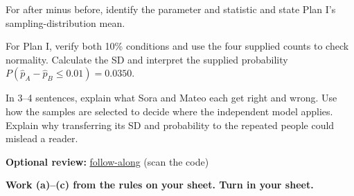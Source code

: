 \documentclass[14pt]{extarticle}
\begin{document}
\begin{description}[leftmargin=1.15in, labelwidth=1in, itemsep=2pt, topsep=2pt]
  \item[\dokbadge{1}~(a)] For after minus before, identify the parameter and statistic and state Plan I's sampling-distribution mean.
  \item[\dokbadge{2}~(b)] For Plan I, verify both 10\% conditions and use the four supplied counts to check normality. Calculate the SD and interpret the supplied probability $P(\widehat p_A-\widehat p_B\leq0.01)=0.0350$.
  \item[\dokbadge{3}~(c)] In 3--4 sentences, explain what Sora and Mateo each get right and wrong. Use how the samples are selected to decide where the independent model applies. Explain why transferring its SD and probability to the repeated people could mislead a reader.
\end{description}

\vfill
\noindent\begin{minipage}{0.84\linewidth}
\textbf{Optional review:} \href{https://robjohncolson.github.io/apstats-live-worksheet/u5_lesson6_live.html}{follow-along} (scan the code)\par
\textbf{Work (a)--(c) from the rules on your sheet. Turn in your sheet.}
\end{minipage}\hfill
{}
\end{document}
